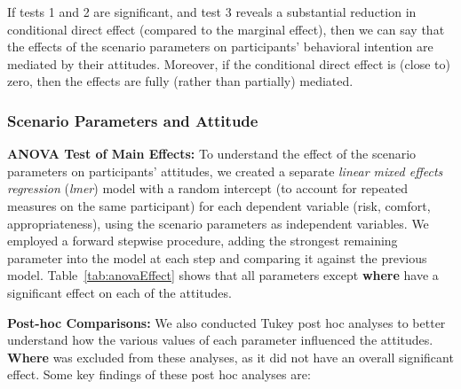 If tests 1 and 2 are significant, and test 3 reveals a substantial reduction in conditional direct effect (compared to the marginal effect), then we can say that the effects of the scenario parameters on participants' behavioral intention are mediated by their attitudes. Moreover, if the conditional direct effect is (close to) zero, then the effects are fully (rather than partially) mediated.

\subsubsection{Scenario Parameters and Attitude}\label{subsec:attitude}
\textbf{ANOVA Test of Main Effects: }
To understand the effect of the scenario parameters on participants' attitudes, we created a separate \textit{linear mixed effects regression} (\textit{lmer}) model with a random intercept (to account for repeated measures on the same participant) for each dependent variable (risk, comfort, appropriateness), using the scenario parameters as independent variables. We employed a forward stepwise procedure, adding the strongest remaining parameter into the model at each step and comparing it against the previous model. Table~\ref{tab:anovaEffect} shows that all parameters except \textbf{where} have a significant effect on each of the attitudes.

\textbf{Post-hoc Comparisons: }
We also conducted Tukey post hoc analyses to better understand how the various values of each parameter influenced the attitudes. \textbf{Where} was excluded from these analyses, as it did not have an overall significant effect. Some key findings of these post hoc analyses are:

